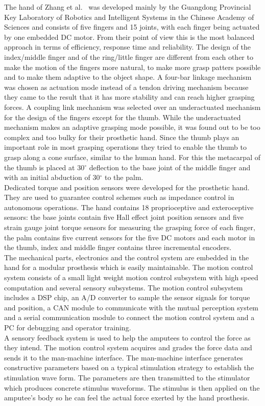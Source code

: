 \documentclass[a4paper, 10pt, conference]{ieeeconf}      %
\begin{document}
The hand of Zhang et al.~\cite{zhang} was developed mainly by the Guangdong Provincial Key Laboratory of Robotics and Intelligent Systems in the Chinese Academy of Sciences and consists of five fingers and 15 joints, with each finger being actuated by one embedded DC motor. From their point of view this is the most balanced approach in terms of efficiency, response time and reliability. The design of the index/middle finger and of the ring/little finger are different from each other to make the motion of the fingers more natural, to make more grasp patters possible and to make them adaptive to the object shape. A four-bar linkage mechanism was chosen as actuation mode instead of a tendon driving mechanism because they came to the result that it has more stability and can reach higher grasping forces. A coupling link mechanism was selected over an underactuated mechanism for the design of the fingers except for the thumb. While the underactuated mechanism makes an adaptive grasping mode possible, it was found out to be too complex and too bulky for their prosthetic hand. Since the thumb plays an important role in most grasping operations they tried to enable the thumb to grasp along a cone surface, similar to the human hand. For this the metacarpal of the thumb is placed at 30$^\circ$ deflection to the base joint of the middle finger and with an initial abduction of 30$^\circ$ to the palm.\\
Dedicated torque and position sensors were developed for the prosthetic hand. They are used to guarantee control schemes such as impedance control in autonomous operations. The hand contains 18 proprioceptive and exteroceptive sensors: the base joints contain five Hall effect joint position sensors and five strain gauge joint torque sensors for measuring the grasping force of each finger, the palm contains five current sensors for the five DC motors and each motor in the thumb, index and middle finger contains three incremental encoders.\\
The mechanical parts, electronics and the control system are embedded in the hand for a modular prosthesis which is easily maintainable. The motion control system consists of a small light weight motion control subsystem with high speed computation and several sensory subsystems. The motion control subsystem includes a DSP chip, an A/D converter to sample the sensor signals for torque and position, a CAN module to communicate with the mutual perception system and a serial communication module to connect the motion control system and a PC for debugging and operator training.\\
A sensory feedback system is used to help the amputees to control the force as they intend. The motion control system acquires and grades the force data and sends it to the man-machine interface. The man-machine interface generates constructive parameters based on a typical stimulation strategy to establish the stimulation wave form. The parameters are then transmitted to the stimulator which produces concrete stimulus waveforms. The stimulus is then applied on the amputee's body so he can feel the actual force exerted by the hand prosthesis. 
\end{document}
